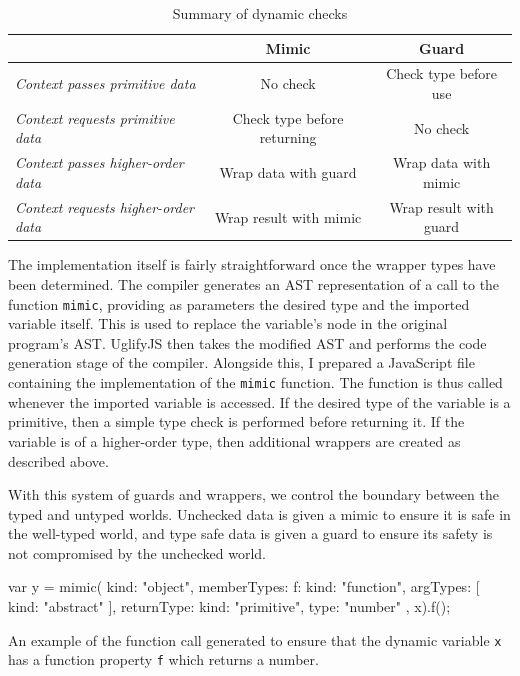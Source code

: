 \documentclass[12pt,a4paper,twoside,openright]{report}
\theoremstyle{definition}
\theoremstyle{dotless}
\begin{document}
\begin{table}[h]
  \begin{tabular}{@{}lcc@{}}
	\toprule
    & \textbf{Mimic} & \textbf{Guard}               \\ \midrule
	\textit{Context passes primitive data}   & No check & Check type before use        \\
	\textit{Context requests primitive data} & Check type before returning & No check \\
	\textit{Context passes higher-order data} & Wrap data with guard & Wrap data with mimic \\
	\textit{Context requests higher-order data} & Wrap result with mimic & Wrap result with guard \\

	\bottomrule
  \end{tabular}
  \caption{Summary of dynamic checks}
  \label{tbl:chkSummary}
\end{table}
The implementation itself is fairly straightforward once the wrapper types 
have been determined. The compiler generates an AST representation of a
call to the function \texttt{mimic}, providing as parameters 
the desired type and the imported variable itself. This is used to replace the 
variable's node in the original program's AST. UglifyJS then takes the modified AST and 
performs the code generation stage of the compiler. Alongside this, I prepared
a JavaScript file containing the implementation of the \texttt{mimic} function. 
The function is thus called whenever the imported variable is accessed. If the
desired type of the variable is a primitive, then a simple type check is performed 
before returning it. If the variable is of a higher-order type, then additional
wrappers are created as described above.

With this system of guards and wrappers, we control the boundary between the
typed and untyped worlds. Unchecked data is given a mimic to ensure it is safe
in the well-typed world, and type safe data is given a guard to ensure its
safety is not compromised by the unchecked world.

\begin{listing}
  \begin{jscript}
	var y = mimic({
	  kind: "object",
	  memberTypes: {
	    f: {
	      kind: "function",
	      argTypes: [ {
	        kind: "abstract"
	      } ],
	      returnType: {
	        kind: "primitive",
	        type: "number"
	      }
	    }
	  }
	}, x).f();
  \end{jscript}
  \caption{An example of the function call generated to ensure that the 
  	dynamic variable \texttt{x} has a function property \texttt{f} which returns a number.}
  \label{lst:importPrim}
\end{listing}
\end{document}

